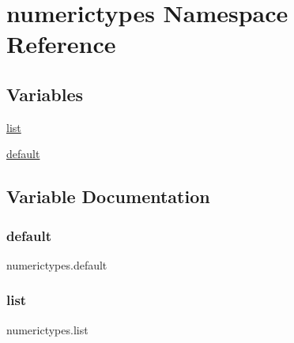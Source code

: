 \hypertarget{namespacenumerictypes}{}\section{numerictypes Namespace Reference}
\label{namespacenumerictypes}
\subsection*{Variables}
\begin{DoxyCompactItemize}
\item 
\hyperlink{namespacenumerictypes_a840c927b4dfc914489ccaf7dc454e0dd}{list}
\item 
\hyperlink{namespacenumerictypes_ad965f1ba6c8cc54bfc6114d0398b5e95}{default}
\end{DoxyCompactItemize}


\subsection{Variable Documentation}
\mbox{\label{namespacenumerictypes_ad965f1ba6c8cc54bfc6114d0398b5e95}} 
\subsubsection{\texorpdfstring{default}{default}}
{\footnotesize\ttfamily numerictypes.\+default}

\mbox{\label{namespacenumerictypes_a840c927b4dfc914489ccaf7dc454e0dd}} 
\subsubsection{\texorpdfstring{list}{list}}
{\footnotesize\ttfamily numerictypes.\+list}

